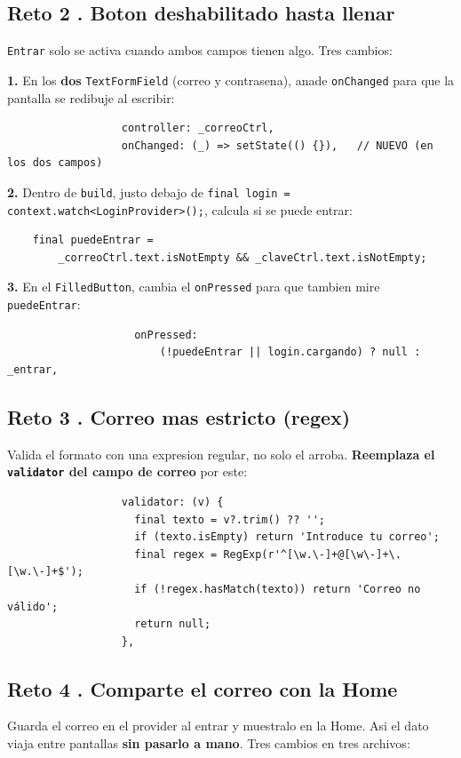 \documentclass[11pt,a4paper,oneside]{book}
\begin{document}
\subsection*{Reto 2 . Boton deshabilitado hasta llenar}
\texttt{Entrar} solo se activa cuando ambos campos tienen algo. Tres cambios:

\noindent\textbf{1.} En los \textbf{dos} \texttt{TextFormField} (correo y contrasena),
anade \texttt{onChanged} para que la pantalla se redibuje al escribir:
\begin{lstlisting}
                  controller: _correoCtrl,
                  onChanged: (_) => setState(() {}),   // NUEVO (en los dos campos)
\end{lstlisting}

\noindent\textbf{2.} Dentro de \texttt{build}, justo debajo de
\texttt{final login = context.watch<LoginProvider>();}, calcula si se puede entrar:
\begin{lstlisting}
    final puedeEntrar =
        _correoCtrl.text.isNotEmpty && _claveCtrl.text.isNotEmpty;
\end{lstlisting}

\noindent\textbf{3.} En el \texttt{FilledButton}, cambia el \texttt{onPressed} para
que tambien mire \texttt{puedeEntrar}:
\begin{lstlisting}
                    onPressed:
                        (!puedeEntrar || login.cargando) ? null : _entrar,
\end{lstlisting}

\subsection*{Reto 3 . Correo mas estricto (regex)}
Valida el formato con una expresion regular, no solo el arroba. \textbf{Reemplaza el
\texttt{validator} del campo de correo} por este:
\begin{lstlisting}
                  validator: (v) {
                    final texto = v?.trim() ?? '';
                    if (texto.isEmpty) return 'Introduce tu correo';
                    final regex = RegExp(r'^[\w.\-]+@[\w\-]+\.[\w.\-]+$');
                    if (!regex.hasMatch(texto)) return 'Correo no válido';
                    return null;
                  },
\end{lstlisting}

\subsection*{Reto 4 . Comparte el correo con la Home}
Guarda el correo en el provider al entrar y muestralo en la Home. Asi el dato viaja
entre pantallas \textbf{sin pasarlo a mano}. Tres cambios en tres archivos:
\end{document}
